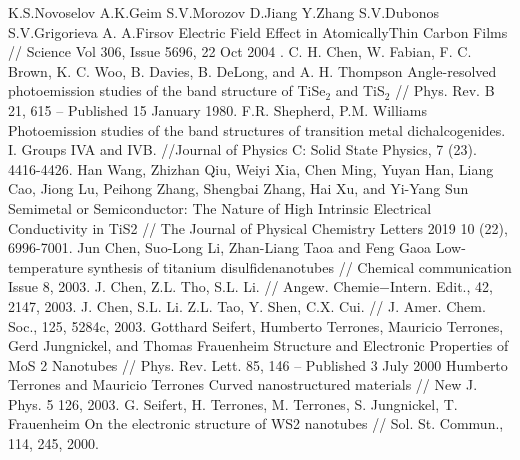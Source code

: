 \begin{thebibliography}{3}
K.S.Novoselov A.K.Geim S.V.Morozov D.Jiang Y.Zhang S.V.Dubonos S.V.Grigorieva A. A.Firsov Electric Field Effect in AtomicallyThin Carbon Films // Science Vol 306, Issue 5696, 22 Oct 2004 .
 C. H. Chen, W. Fabian, F. C. Brown, K. C. Woo, B. Davies, B. DeLong, and A. H. Thompson
Angle-resolved photoemission studies of the band structure of TiSe$_{2}$ and TiS$_{2}$ // Phys. Rev. B 21, 615 – Published 15 January 1980.
 F.R. Shepherd, P.M. Williams Photoemission studies of the band structures of transition metal dichalcogenides. I. Groups IVA and IVB. //Journal of Physics C: Solid State Physics, 7 (23). 4416-4426.
 Han Wang, Zhizhan Qiu, Weiyi Xia, Chen Ming, Yuyan Han, Liang Cao, Jiong Lu, Peihong Zhang, Shengbai Zhang, Hai Xu, and Yi-Yang Sun Semimetal or Semiconductor: The Nature of High Intrinsic Electrical Conductivity in TiS2 // The Journal of Physical Chemistry Letters 2019 10 (22), 6996-7001.
 Jun Chen, Suo-Long Li, Zhan-Liang Taoa and Feng Gaoa Low-temperature synthesis of titanium disulfidenanotubes //  Chemical communication Issue 8, 2003.
 J. Chen, Z.L. Tho, S.L. Li. // Angew. Chemie−Intern. Edit., 42, 2147, 2003.
 J. Chen, S.L. Li. Z.L. Tao, Y. Shen, C.X. Cui. // J. Amer. Chem. Soc., 125, 5284c, 2003.
 Gotthard Seifert, Humberto Terrones, Mauricio Terrones, Gerd Jungnickel, and Thomas Frauenheim Structure and Electronic Properties of MoS 2 Nanotubes // Phys. Rev. Lett. 85, 146 – Published 3 July 2000
 Humberto Terrones and Mauricio Terrones Curved nanostructured materials // New J. Phys. 5 126, 2003.
 G. Seifert, H. Terrones, M. Terrones, S. Jungnickel, T. Frauenheim On the electronic structure of WS2 nanotubes //  Sol. St. Commun., 114, 245, 2000.
\end{thebibliography}
